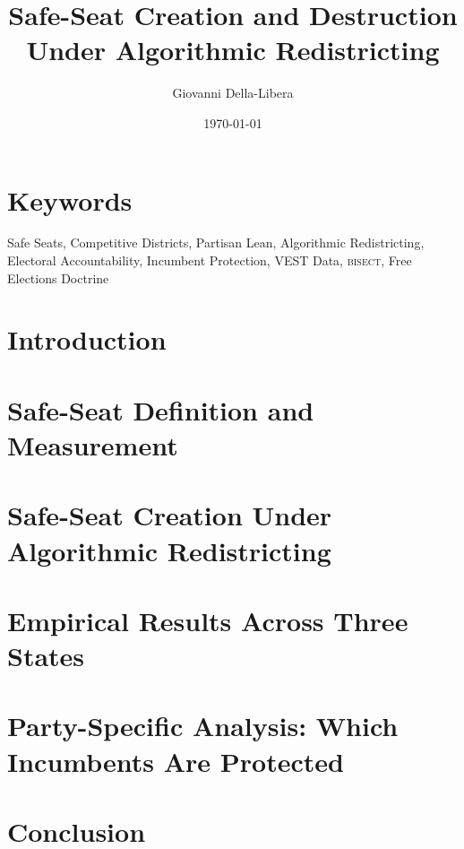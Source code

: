 \documentclass[12pt]{article}
\title{\textbf{Safe-Seat Creation and Destruction\\
Under Algorithmic Redistricting}}
\author{Giovanni Della-Libera}
\date{\today}
\begin{document}
\maketitle

\begin{abstract}

\end{abstract}

\section*{Keywords}
Safe Seats, Competitive Districts, Partisan Lean, Algorithmic Redistricting,
Electoral Accountability, Incumbent Protection, VEST Data, \textsc{bisect},
Free Elections Doctrine

\section{Introduction}


\section{Safe-Seat Definition and Measurement}


\section{Safe-Seat Creation Under Algorithmic Redistricting}


\section{Empirical Results Across Three States}


\section{Party-Specific Analysis: Which Incumbents Are Protected}


\section{Conclusion}




\end{document}
